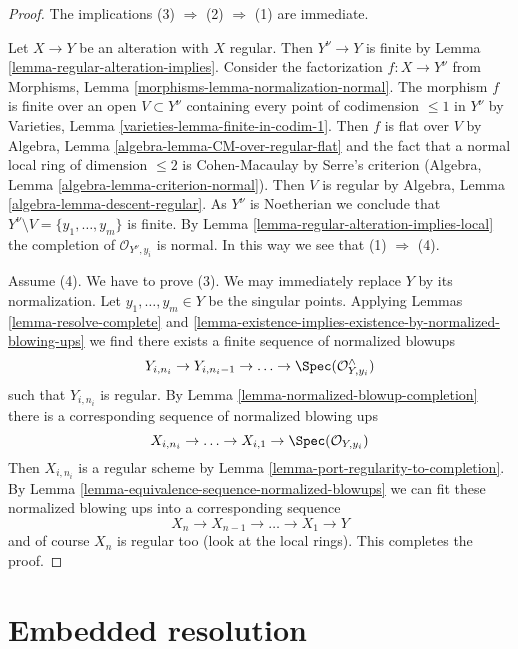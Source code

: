 \begin{proof}
The implications (3) $\Rightarrow$ (2) $\Rightarrow$ (1) are immediate.

\medskip\noindent
Let $X \to Y$ be an alteration with $X$ regular. Then $Y^\nu \to Y$
is finite by Lemma \ref{lemma-regular-alteration-implies}.
Consider the factorization $f : X \to Y^\nu$ from 
Morphisms, Lemma \ref{morphisms-lemma-normalization-normal}.
The morphism $f$ is finite over an open $V \subset Y^\nu$ containing
every point of codimension $\leq 1$ in $Y^\nu$
by Varieties, Lemma \ref{varieties-lemma-finite-in-codim-1}.
Then $f$ is flat over $V$ by
Algebra, Lemma \ref{algebra-lemma-CM-over-regular-flat}
and the fact that a normal local ring
of dimension $\leq 2$ is Cohen-Macaulay by Serre's criterion
(Algebra, Lemma \ref{algebra-lemma-criterion-normal}).
Then $V$ is regular by Algebra, Lemma \ref{algebra-lemma-descent-regular}.
As $Y^\nu$ is Noetherian we conclude that
$Y^\nu \setminus V = \{y_1, \ldots, y_m\}$ is finite.
By Lemma \ref{lemma-regular-alteration-implies-local}
the completion of $\mathcal{O}_{Y^\nu, y_i}$ is normal.
In this way we see that (1) $\Rightarrow$ (4).

\medskip\noindent
Assume (4). We have to prove (3). We may immediately replace
$Y$ by its normalization. Let $y_1, \ldots, y_m \in Y$ be the
singular points. Applying
Lemmas \ref{lemma-resolve-complete} and
\ref{lemma-existence-implies-existence-by-normalized-blowing-ups}
we find  there exists a finite sequence of normalized blowups
$$
Y_{i, n_i} \to Y_{i, n_i - 1} \to \ldots \to \Spec(\mathcal{O}^\wedge_{Y, y_i})
$$
such that $Y_{i, n_i}$ is regular. By
Lemma \ref{lemma-normalized-blowup-completion}
there is a corresponding sequence of normalized blowing ups
$$
X_{i, n_i} \to \ldots \to X_{i, 1} \to \Spec(\mathcal{O}_{Y, y_i})
$$
Then $X_{i, n_i}$ is a regular scheme by
Lemma \ref{lemma-port-regularity-to-completion}.
By Lemma \ref{lemma-equivalence-sequence-normalized-blowups}
we can fit these normalized blowing ups
into a corresponding sequence
$$
X_n \to X_{n - 1} \to \ldots \to X_1 \to Y
$$
and of course $X_n$ is regular too (look at the local rings).
This completes the proof.
\end{proof}






\section{Embedded resolution}
\label{section-embedded}


